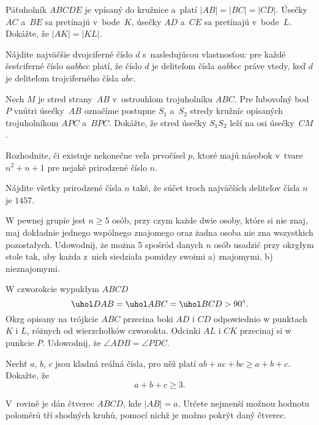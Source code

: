 {%
Päťuholník $ABCDE$ je vpísaný do kružnice a~platí $|AB|=|BC|=|CD|$. Úsečky $AC$ a~$BE$ sa pretínajú v~bode~$K$, úsečky $AD$ a~$CE$ sa pretínajú v~bode~$L$. Dokážte, že $|AK|=|KL|$.}

{%
Nájdite najväčšie dvojciferné číslo $d$ s~nasledujúcou vlastnosťou: pre každé šesťciferné číslo $\overline{aabbcc}$ platí, že číslo $d$ je deliteľom čísla $\overline{aabbcc}$ práve vtedy, keď $d$ je deliteľom trojciferného čísla $\overline{abc}$.}

{%
Nech $M$ je stred strany~$AB$ v~ostrouhlom trojuholníku $ABC$.
Pre ľubovoľný bod~$P$ vnútri úsečky~$AB$ označíme postupne $S_1$ a~$S_2$ stredy kružníc opísaných trojuholníkom $APC$ a~$BPC$. Dokážte,
že stred úsečky $S_1S_2$ leží na osi úsečky~$CM$.}

{%
Rozhodnite, či existuje nekonečne veľa prvočísel $p$, ktoré majú
násobok v~tvare $n^2+n+1$ pre nejaké prirodzené číslo $n$.
}

{%
Nájdite všetky prirodzené čísla $n$ také, že súčet troch najväčších deliteľov čísla $n$ je $1457$.
}

{%
W pewnej grupie jest $n \ge 5$ osób, przy czym każde dwie osoby, które si\ę{} nie znaj\ą{}, maj\ą{} dok\l{}adnie jednego wspólnego znajomego oraz żadna osoba nie zna wszystkich pozosta\l{}ych. Udowodnij, że można 5 spośród danych $n$ osób usadzić przy okr\ą{}g\l{}ym stole tak, aby każda z~nich siedzia\l{}a pomi\ę{}dzy swoimi
\ite a) znajomymi,
\ite b) nieznajomymi.
}

{%
W czworok\ą{}cie wypuk\l{}ym $ABCD$
$$
\uhol DAB = \uhol ABC = \uhol BCD > 90^\circ.
$$
Okr\ą{}g opisany na trójk\ą{}cie $ABC$ przecina boki $AD$ i $CD$ odpowiednio w punktach $K$ i $L$, różnych od wierzcho\l{}ków czworok\ą{}ta. Odcinki $AL$ i $CK$ przecinaj\ą{} si\ę{} w punkcie $P$. Udowodnij, że $\angle ADB = \angle PDC$.
}

{%
Nechť $a$, $b$, $c$ jsou kladná reálná čísla, pro něž platí $ab+ac+bc\ge a+b+c$. Dokažte, že
$$
a+b+c\ge3.
$$}

{%
V~rovině je dán čtverec $ABCD$, kde $|AB|=a$. Určete nejmenší možnou hodnotu poloměrů
tří shodných kruhů, pomocí nichž je možno pokrýt daný čtverec.}

